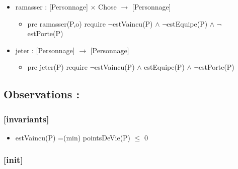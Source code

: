 \documentclass[11pt]{article}
\begin{document}
\begin{itemize}
\item ramasser : [Personnage] $\times$ Chose $\to$ [Personnage]\\
\label{sec-1.6.1.5}

\begin{itemize}

\item pre ramasser(P,o) require $\neg$estVaincu(P) $\wedge$ $\neg$estEquipe(P) $\wedge$ $\neg$estPorte(P)\\
\label{sec-1.6.1.5.1}

\end{itemize} %

\item jeter : [Personnage]  $\to$ [Personnage]\\
\label{sec-1.6.1.6}

\begin{itemize}

\item pre jeter(P) require $\neg$estVaincu(P) $\wedge$ estEquipe(P) $\wedge$ $\neg$estPorte(P)\\
\label{sec-1.6.1.6.1}



\end{itemize} %
\end{itemize} %
\subsection{Observations :}
\label{sec-1.7}

\subsubsection{[invariants]}
\label{sec-1.7.1}

\begin{itemize}

\item estVaincu(P) =(min) pointsDeVie(P) $\leqslant$ 0\\
\label{sec-1.7.1.1}


\end{itemize} %
\subsubsection{[init]}
\label{sec-1.7.2}
\end{document}
